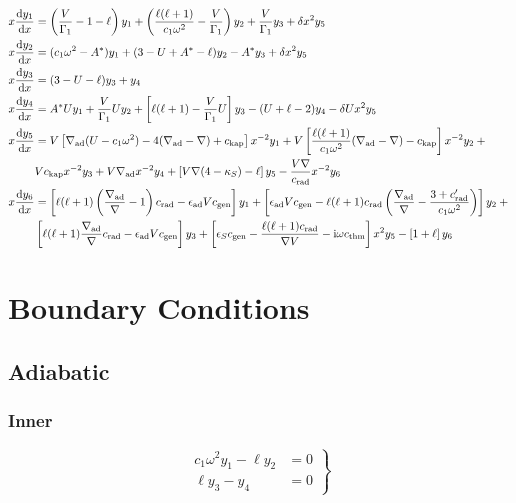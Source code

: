 \documentclass{article}
\newcommand{\diff}{\ensuremath{\mathrm{d}}}
\newcommand{\ii}{\ensuremath{\mathrm{i}}}
\newcommand{\Vg}{\ensuremath{\frac{V}{\Gamma_{1}}}}
\newcommand{\As}{\ensuremath{A^{\ast}}}
\newcommand{\nabad}{\ensuremath{\nabla_{\rm ad}}}
\newcommand{\kapS}{\ensuremath{\kappa_{S}}}
\newcommand{\epsad}{\ensuremath{\epsilon_{\rm ad}}}
\newcommand{\epsS}{\ensuremath{\epsilon_{S}}}
\newcommand{\crad}{\ensuremath{c_{\rm rad}}}
\newcommand{\cgen}{\ensuremath{c_{\rm gen}}}
\newcommand{\cthm}{\ensuremath{c_{\rm thm}}}
\newcommand{\ckap}{\ensuremath{c_{\rm kap}}}
\begin{document}
\begin{align*}
x \frac{\diff y_{1}}{\diff x} &=
\left(\Vg - 1 - \ell \right) y_{1} +
\left(\frac{\ell(\ell+1)}{c_{1} \omega^{2}} - \Vg \right) y_{2} +
\Vg y_{3} +
\delta x^{2} y_{5} \\
x \frac{\diff y_{2}}{\diff x} &=
(c_{1} \omega^{2} - \As ) y_{1} +
(3 - U + \As - \ell) y_{2} -
\As y_{3} +
\delta x^{2} y_{5} \\
x \frac{\diff y_{3}}{\diff x} &=
(3 - U - \ell) y_{3} +
y_{4} \\
x \frac{\diff y_{4}}{\diff x} &=
\As U y_{1} +
\Vg U y_{2} +
\left[ \ell(\ell+1) - \Vg U \right] y_{3} -
(U + \ell - 2) y_{4}
- \delta U x^{2} y_{5} \\
x \frac{\diff y_{5}}{\diff x} &=
V \left[ \nabad (U - c_{1}\omega^{2}) - 4 (\nabad - \nabla) + \ckap \right] x^{-2} y_{1} + 
V \left[ \frac{\ell(\ell+1)}{c_{1} \omega^{2}} (\nabad - \nabla) - \ckap \right] x^{-2} y_{2} + \mbox{} \\
& 
V \ckap x^{-2} y_{3} + 
V \nabad x^{-2} y_{4} + 
\left[ V \nabla (4 - \kapS) - \ell \right] y_{5} -
\frac{V \nabla}{\crad} x^{-2} y_{6} \\
x \frac{\diff y_{6}}{\diff x} &=
\left[ \ell(\ell+1)\left( \frac{\nabad}{\nabla} - 1 \right) \crad - \epsad V \cgen \right] y_{1} +
\left[ \epsad V \cgen - \ell(\ell+1)\crad \left( \frac{\nabad}{\nabla} - \frac{3 + \crad'}{c_{1}\omega^{2}} \right) \right] y_{2} + \mbox{} \\
&
\left[ \ell(\ell+1) \frac{\nabad}{\nabla} \crad - \epsad V \cgen \right] y_{3} +
\left[ \epsS \cgen - \frac{\ell(\ell+1)\crad}{\nabla V} - \ii \omega \cthm\right] x^{2} y_{5} -
\left[ 1 + \ell \right] y_{6}
\end{align*}


\section*{Boundary Conditions}

\subsection*{Adiabatic}

\subsubsection*{Inner}

\begin{equation*}
\left.
\begin{aligned}
c_{1} \omega^{2} y_{1} - \ell y_{2} &= 0 \\
\ell y_{3} - y_{4} &= 0
\end{aligned}
\right\}
\end{equation*}
\end{document}
